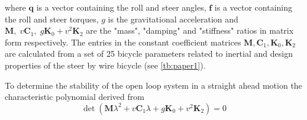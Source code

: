 where \ensuremath{\mathbf{q}} is a vector containing the roll and steer angles, \ensuremath{\mathbf{f}} is a vector containing the roll and steer torques, \ensuremath{g} is the gravitational acceleration and \ensuremath{\mathbf{M},\;v\mathbf{C}_{1},\;g \mathbf{K}_{0}+v^{2} \mathbf{K}_{2}} are the "mass", "damping" and "stiffness" ratios in matrix form respectively. The entries in the constant coefficient matrices  \ensuremath{\mathbf{M},\mathbf{C}_{1}, \mathbf{K}_{0},  \mathbf{K}_{2}} are calculated from a set of 25 bicycle parameters related to inertial and design properties of the steer by wire bicycle (see \cref{tb:paper1}).

To determine the stability of the open loop system in a straight ahead motion the characteristic polynomial derived from
\begin{equation}
    \operatorname{det}\left(\mathbf{M} \lambda^{2}+v \mathbf{C}_{1} \lambda+g \mathbf{K}_{0}+v^{2} \mathbf{K}_{2}\right)=0
    \label{eq:paper2}
\end{equation}

